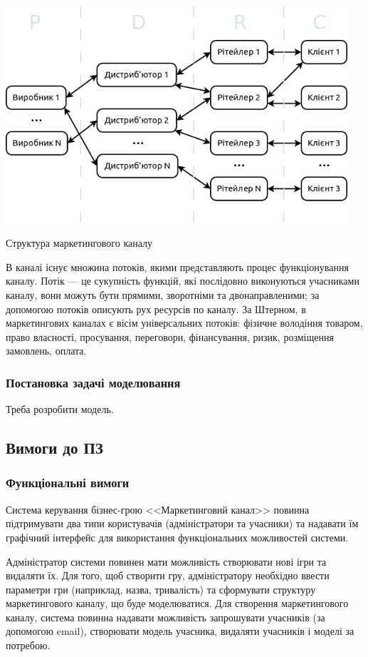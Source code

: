             \begin{stdfigure}
                \includegraphics[width=5in]{images/channel_structure.png}
                \caption{Структура маркетингового каналу}
                \label{fig:channel_structure}
            \end{stdfigure}    
В каналі існує множина потоків, якими представляють процес функціонування каналу. Потік --- це сукупність функцій, які послідовно виконуються учасниками каналу, вони можуть бути прямими, зворотніми та двонаправленими; за допомогою потоків описують рух ресурсів по каналу. За Штерном, в маркетингових каналах є вісім універсальних потоків\cite{stern}: фізичне володіння товаром, право власності, просування, переговори, фінансування, ризик, розміщення замовлень, оплата.

        \subsubsection{Постановка задачі моделювання}
 Треба розробити модель.
    \subsection{Вимоги до ПЗ}
        \subsubsection{Функціональні вимоги}
Система керування бізнес-грою <<Маркетинговий канал>> повинна підтримувати два типи користувачів (адміністратори та учасники) та надавати їм графічний інтерфейс для використання функціональних можливостей системи.

Адміністратор системи повинен мати можливість створювати нові ігри та видаляти їх. Для того, щоб створити гру, адміністратору необхідно ввести параметри гри (наприклад, назва, тривалість) та сформувати структуру маркетингового каналу, що буде моделюватися. Для створення маркетингового каналу, система повинна надавати можливість запрошувати учасників (за допомогою email), створювати модель учасника, видаляти учасників і моделі за потребою. 

